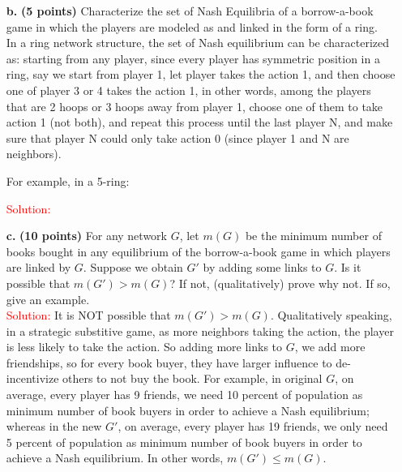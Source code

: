 \documentclass[11pt]{article} %
\begin{document}
\begin{itemize}
\item[\textbf{b.}] \textbf{(5 points)}  Characterize the set of Nash Equilibria of a borrow-a-book game in which the players are modeled as and linked in the form of a ring. \\

In a ring network structure, the set of Nash equilibrium can be characterized as: starting from any player, since every player has symmetric position in a ring, say we start from player 1, let player takes the action 1, and then choose one of player 3 or 4 takes the action 1, in other words, among the players that are 2 hoops or 3 hoops away from player 1, choose one of them to take action 1 (not both), and repeat this process until the last player N, and make sure that player N could only take action 0 (since player 1 and N are neighbors). 

For example, in a 5-ring:
\begin{center}
\end{center}


\textcolor{red}{Solution:}
\item[\textbf{c.}]  \textbf{(10 points)} For any network $G$, let $m(G)$ be the minimum number of books bought in any equilibrium of the borrow-a-book game in which players are linked by $G$. Suppose we obtain $G'$ by adding some links to $G$. Is it possible that $m(G')>m(G)$? If not, (qualitatively) prove why not. If so, give an example.\\

\textcolor{red}{Solution:}
It is NOT possible that $m(G')>m(G)$. Qualitatively speaking, in a strategic substitive game, as more neighbors taking the action, the player is less likely to take the action. So adding more links to $G$, we add more friendships, so for every book buyer, they have larger influence to de-incentivize others to not buy the book. For example, in original $G$, on average, every player has 9 friends, we need 10 percent of population as minimum number of book buyers in order to achieve a Nash equilibrium; whereas in the new $G'$, on average, every player has 19 friends, we only need 5 percent of population as minimum number of book buyers in order to achieve a Nash equilibrium. In other words,  $m(G')\le m(G)$. 


\end{itemize}
\end{document}
